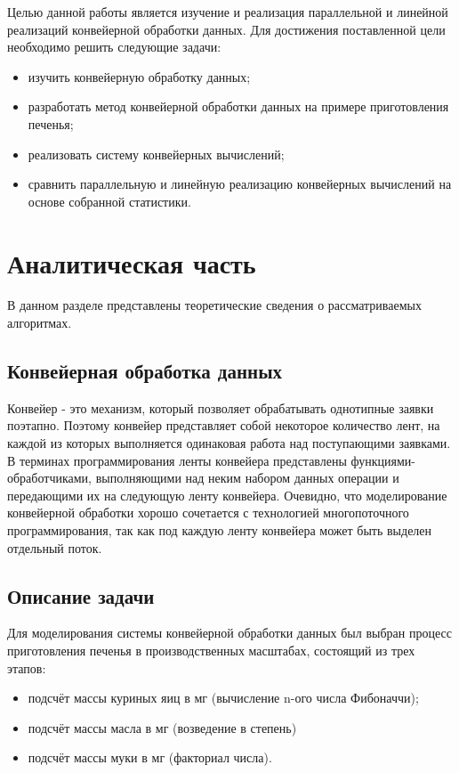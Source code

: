 \documentclass[12pt]{report}
\begin{document}
Целью данной работы является  изучение и реализация параллельной и линейной реализаций конвейерной обработки данных. Для достижения поставленной цели необходимо решить следующие задачи:
\begin{itemize}
    \item изучить конвейерную обработку данных;
    \item разработать метод конвейерной обработки данных на примере приготовления печенья;
	\item реализовать систему конвейерных вычислений;
	\item сравнить параллельную и линейную реализацию конвейерных вычислений на основе собранной статистики.
\end{itemize}

\chapter{Аналитическая часть}

В данном разделе представлены теоретические сведения о рассматриваемых алгоритмах.

\section{Конвейерная обработка данных}

Конвейер - это механизм, который позволяет обрабатывать однотипные заявки поэтапно. Поэтому конвейер представляет собой некоторое количество лент, на каждой из которых выполняется одинаковая работа над поступающими заявками. В терминах программирования ленты конвейера представлены функциями-обработчиками, выполняющими над неким набором данных операции и передающими их на следующую ленту конвейера. Очевидно, что моделирование конвейерной обработки хорошо сочетается с технологией многопоточного программирования, так как под каждую ленту конвейера может быть выделен отдельный поток. 

\section{Описание задачи}

Для моделирования системы конвейерной обработки данных был выбран процесс приготовления печенья в производственных масштабах, состоящий из трех этапов:

\begin{itemize}
	\item подсчёт массы куриных яиц в мг (вычисление n-ого числа Фибоначчи);
	\item подсчёт массы масла в мг (возведение в степень)
	\item подсчёт массы муки в мг (факториал числа).
\end{itemize}
\end{document}
